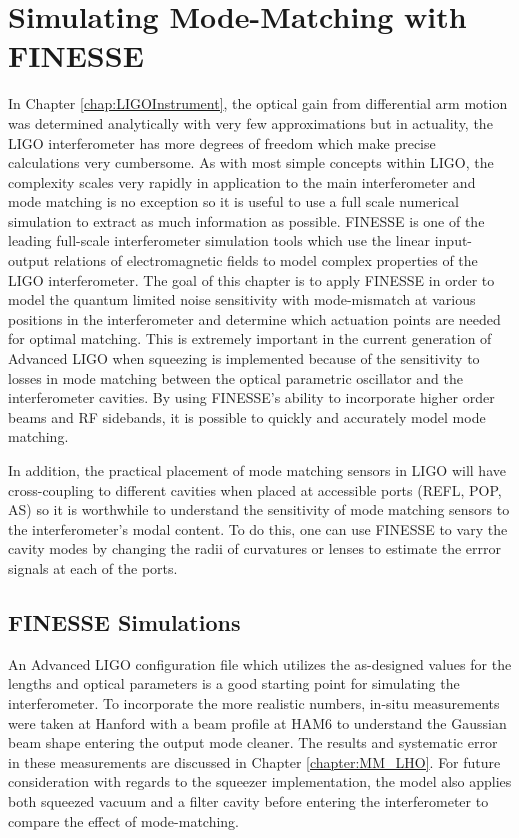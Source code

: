 \chapter{Simulating Mode-Matching with FINESSE}
In Chapter \ref{chap:LIGOInstrument}, the optical gain from differential arm motion was determined analytically with very few approximations but in actuality, the LIGO interferometer has more degrees of freedom which make precise calculations very cumbersome.  As with most simple concepts within LIGO, the complexity scales very rapidly in application to the main interferometer and mode matching is no exception so it is useful to use a full scale numerical simulation to extract as much information as possible.  FINESSE \cite{FinesseManual} \cite{FinesseTechniques} is one of the leading full-scale interferometer simulation tools which use the linear input-output relations of electromagnetic fields to model complex properties of the LIGO interferometer.  The goal of this chapter is to apply FINESSE in order to model the quantum limited noise sensitivity with mode-mismatch at various positions in the interferometer and determine which actuation points are needed for optimal matching.  This is extremely important in the current generation of Advanced LIGO when squeezing is implemented because of the sensitivity to losses in mode matching between the optical parametric oscillator and the interferometer cavities.  By using FINESSE's ability to incorporate higher order beams and RF sidebands, it is possible to quickly and accurately model mode matching.

In addition, the practical placement of mode matching sensors in LIGO will have cross-coupling to different cavities when placed at accessible ports (REFL, POP, AS) so it is worthwhile to understand the sensitivity of mode matching sensors to the interferometer's modal content.  To do this, one can use FINESSE to vary the cavity modes by changing the radii of curvatures or lenses to estimate the errror signals at each of the ports.

	\section{FINESSE Simulations}
		An Advanced LIGO configuration file \cite{FinesseH1} which utilizes the as-designed values for the lengths and optical parameters is a good starting point for simulating the interferometer.  To incorporate the more realistic numbers, in-situ measurements were taken at Hanford with a beam profile at HAM6 to understand the Gaussian beam shape entering the output mode cleaner. The results and systematic error in these measurements are discussed in Chapter \ref{chapter:MM_LHO}.  For future consideration with regards to the squeezer implementation, the model also applies both squeezed vacuum and a filter cavity before entering the interferometer to compare the effect of mode-matching.
		
